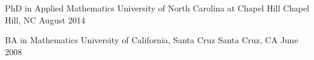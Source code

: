 
\begin{cventries}
  \cventry
    {PhD in Applied Mathematics} %
    {University of North Carolina at Chapel Hill} %
    {Chapel Hill, NC} %
    {August 2014} %
    {
    }

  \cventry
    {BA in Mathematics} %
    {University of California, Santa Cruz} %
    {Santa Cruz, CA} %
    {June 2008} %
    {
    }
    
\end{cventries}

